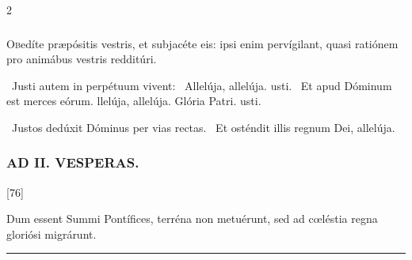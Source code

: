 \documentclass[9pt,twoside]{extarticle}
\begin{document}
\begin{multicols}{2}
\subsubsection*{}
\lettrine{O}bedíte præpósitis vestris, et subjacéte eis: ipsi enim pervígilant, quasi ratiónem pro animábus vestris redditúri.

\begin{tightlist}{}
\item {}~Justi autem in perpétuum vivent: \textred{*}~Allelúja, allelúja. usti. ~Et apud Dóminum est merces eórum. llelúja, allelúja. Glória Patri. usti.
\item {}~Justos dedúxit Dóminus per vias rectas. ~Et osténdit illis regnum Dei, allelúja.
\end{tightlist}

\subsubsection*{\center \textsc{AD II. VESPERAS.}}
\begin{tightlist}{}
\item {} [76]
\item {}
\item {} Dum essent Summi Pontífices, terréna non metuérunt, sed ad cœléstia regna gloriósi migrárunt.
\item {}
\end{tightlist}

\begin{center}\textcolor{red}{\rule{\linewidth}{0.5pt}} \end{center}

\subsection*{\center \textsc{}}
\subsubsection*{\center {}}
\begin{tightlist}{}
\item {}
\item {}
\end{tightlist}


\end{multicols}
\end{document}
